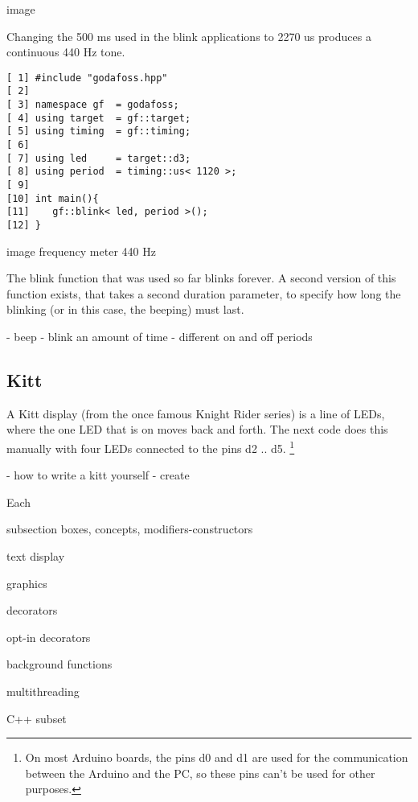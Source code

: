 \documentclass{article}
\begin{document}
image

Changing the 500 ms used in the blink applications to 2270 us produces
a continuous 440 Hz tone.

\lstset {language=C++}
\begin{lstlisting}
[ 1] #include "godafoss.hpp"
[ 2] 
[ 3] namespace gf  = godafoss;
[ 4] using target  = gf::target;
[ 5] using timing  = gf::timing;
[ 6] 
[ 7] using led     = target::d3;
[ 8] using period  = timing::us< 1120 >; 
[ 9] 
[10] int main(){
[11]    gf::blink< led, period >();
[12] }
\end{lstlisting}

image frequency meter 440 Hz

The blink function that was used so far blinks forever.
A second version of this function exists, that takes a second
duration parameter, to specify how long the blinking
(or in this case, the beeping) must last.


- beep
- blink an amount of time
- different on and off periods

\subsection{Kitt}

A Kitt display (from the once famous Knight Rider series) is a line
of LEDs, where the one LED that is on moves back and forth.
The next code does this manually with four LEDs connected to the pins
d2 .. d5.
\footnote{On most Arduino boards, the pins d0 and d1 are used 
for the communication between the Arduino and the PC, so these pins
can't be used for other purposes.}



- how to write a kitt yourself
   - create 

Each 

subsection boxes, concepts, modifiers-constructors

text display

graphics

decorators

opt-in decorators

background functions

multithreading

C++ subset



\end{document}
